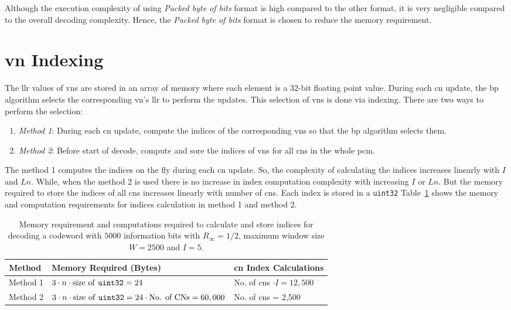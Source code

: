 Although the execution complexity of using \emph{Packed byte of bits} format is high compared to the other format, it is very negligible compared to the overall decoding complexity. Hence, the \emph{Packed byte of bits} format is chosen to reduce the memory requirement.

\section{\acrlong{vn} Indexing}
The \gls{llr} values of \glspl{vn} are stored in an array of memory where each element is a 32-bit floating point value. During each \gls{cn} update, the \gls{bp} algorithm selects the corresponding \gls{vn}'s \gls{llr} to perform the updates. This selection of \glspl{vn} is done via indexing. There are two ways to perform the selection:
\begin{enumerate}
  \item \emph{Method 1}: During each \gls{cn} update, compute the indices of the corresponding \glspl{vn} so that the \gls{bp} algorithm selects them.
  \item \emph{Method 2}: Before start of decode, compute and sore the indices of \glspl{vn} for all \glspl{cn} in the whole \gls{pcm}.
\end{enumerate}

The method 1 computes the indices on the fly during each \gls{cn} update. So, the complexity of calculating the indices increases linearly with $I$ and $Ln$. While, when the method 2 is used there is no increase in index computation complexity with increasing $I$ or $Ln$. But the memory required to store the indices of all \glspl{cn} increases linearly with number of \glspl{cn}. Each index is stored in a \texttt{uint32} Table~\ref{tab:idx_com} shows the memory and computation requirements for indices calculation in method 1 and method 2.
\begin{table}[htbp]
  \centering
  \begin{tabular}{|l|p{7cm}|l|}
    \hline
    \textbf{Method} &\textbf{Memory Required (Bytes)} &\textbf{\gls{cn} Index Calculations}\\
    \hline
    \hline
    Method 1 &$3\cdot n\cdot\text{size of \texttt{uint32}}=24$ &No. of \glspl{cn} $\cdot I=12,500$\\
    \hline
    Method 2 &$3\cdot n\cdot\text{size of \texttt{uint32}}=24\cdot\text{No. of CNs}=60,000$ &No. of \glspl{cn} = 2,500\\
    \hline
  \end{tabular}
  \caption{Memory requirement and computations required to calculate and store indices for decoding a codeword with $5000$ information bits with $R_\infty=1/2$, maximum window size $W=2500$ and $I=5$.}
  \label{tab:idx_com}
\end{table}
 